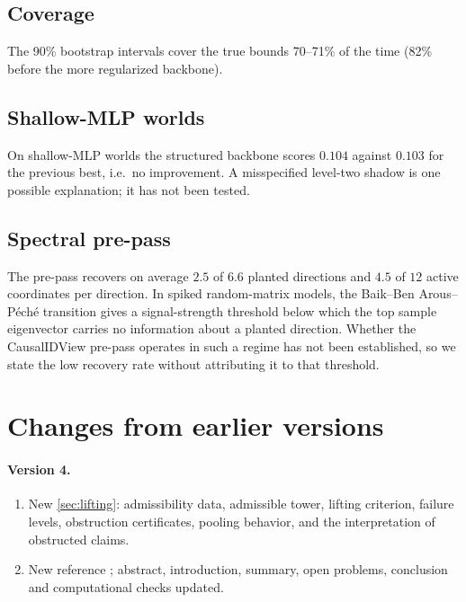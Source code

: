 \documentclass[11pt]{article}
\theoremstyle{definition}
\theoremstyle{remark}
\begin{document}
\subsection{Coverage}
The 90\% bootstrap intervals cover the true bounds 70--71\% of the time (82\% before the more
regularized backbone).

\subsection{Shallow-MLP worlds}
On shallow-MLP worlds the structured backbone scores $0.104$ against $0.103$ for the previous best,
i.e.\ no improvement. A misspecified level-two shadow is one possible explanation; it has not been
tested.

\subsection{Spectral pre-pass}
The pre-pass recovers on average $2.5$ of $6.6$ planted directions and $4.5$ of $12$ active
coordinates per direction. In spiked random-matrix models, the Baik--Ben Arous--P\'ech\'e transition
\cite{BBP2005} gives a signal-strength threshold below which the top sample eigenvector carries no
information about a planted direction. Whether the CausalIDView pre-pass operates in such a regime has
not been established, so we state the low recovery rate without attributing it to that threshold.

\section{Changes from earlier versions}\label{app:changes}

\paragraph{Version 4.}
\begin{enumerate}[leftmargin=*,label=(\alph*)]
\item New \cref{sec:lifting}: admissibility data, admissible tower, lifting criterion, failure levels,
  obstruction certificates, pooling behavior, and the interpretation of obstructed claims.
\item New reference \cite{Schrijver1986}; abstract, introduction, summary, open problems, conclusion
  and computational checks updated.
\end{enumerate}
\end{document}

